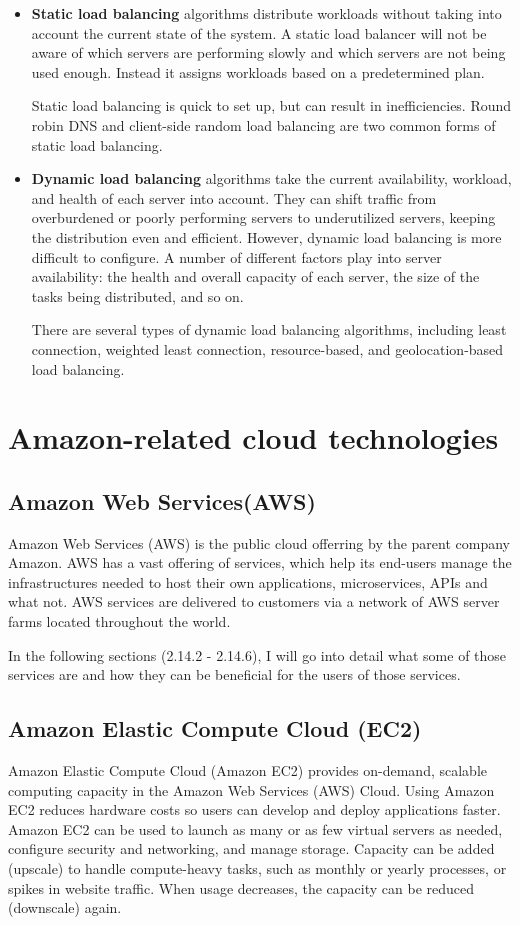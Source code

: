 		\begin{itemize}
			\item \textbf{Static load balancing} algorithms distribute workloads without taking into account the current 
			state of the system. A static load balancer will not be aware of which servers are performing 
			slowly and which servers are not being used enough. 
			Instead it assigns workloads based on a predetermined plan. 
			
			Static load balancing is quick to set up,
			but can result in inefficiencies. Round robin DNS and client-side random load balancing are 
			two common forms of static load balancing.
			\item \textbf{Dynamic load balancing} algorithms take the current availability, workload, 
			and health of each server into account. 
			They can shift traffic from overburdened or poorly performing servers to underutilized servers, 
			keeping the distribution even and efficient. However, dynamic load balancing is more difficult 
			to configure. A number of different factors play into server availability: 
			the health and overall capacity of each server, the size of the tasks being distributed, and so on.

			There are several types of dynamic load balancing algorithms, including least connection, weighted least connection, resource-based, and geolocation-based load balancing.
		\end{itemize}

\section{Amazon-related cloud technologies}
	\subsection{Amazon Web Services(AWS)}
		Amazon Web Services (AWS) is the public cloud offerring by the parent company Amazon. AWS has a vast offering
		of services, which help its end-users manage the infrastructures needed to host their own applications, 
		microservices, APIs and what not.
		AWS services are delivered to customers via a network of AWS server farms located throughout the world.

		In the following sections (2.14.2 - 2.14.6), I will go into detail what some of those services are and how
		they can be beneficial for the users of those services.

	\subsection{Amazon Elastic Compute Cloud (EC2)}
		Amazon Elastic Compute Cloud (Amazon EC2) \cite{ec2} provides on-demand, scalable computing capacity in the Amazon 
		Web Services (AWS) Cloud. Using Amazon EC2 reduces hardware costs so users can develop and deploy applications faster. 
		Amazon EC2 can be used to launch as many or as few virtual servers as needed, configure security and networking, 
		and manage storage. Capacity can be added (upscale) to handle compute-heavy tasks, such as monthly or yearly processes,
		or spikes in website traffic. When usage decreases, the capacity can be reduced (downscale) again.

